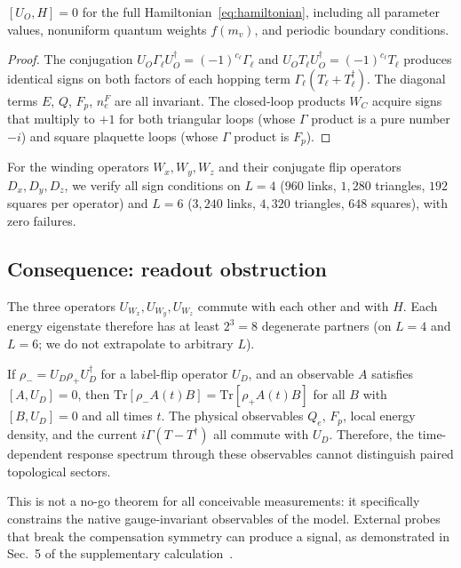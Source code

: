 \documentclass[aps,prb,twocolumn,superscriptaddress,showpacs]{revtex4-2}
\begin{document}
\begin{theorem}
$[U_O,H]=0$ for the full Hamiltonian~\eqref{eq:hamiltonian}, including
all parameter values, nonuniform quantum weights $f(m_v)$, and periodic
boundary conditions.
\end{theorem}

\begin{proof}
The conjugation $U_O\Gamma_\ell U_O^\dagger = (-1)^{c_\ell}\Gamma_\ell$
and $U_OT_\ell U_O^\dagger = (-1)^{c_\ell}T_\ell$ produces identical signs
on both factors of each hopping term $\Gamma_\ell(T_\ell+T_\ell^\dagger)$.
The diagonal terms $E$, $Q$, $F_p$, $n_e^F$ are all invariant. The
closed-loop products $W_C$ acquire signs that multiply to $+1$ for both
triangular loops (whose $\Gamma$ product is a pure number $-i$) and
square plaquette loops (whose $\Gamma$ product is $F_p$).
\end{proof}

For the winding operators $W_x,W_y,W_z$ and their conjugate flip
operators $D_x,D_y,D_z$, we verify all sign conditions on $L=4$
($960$ links, $1{,}280$ triangles, $192$ squares per operator) and
$L=6$ ($3{,}240$ links, $4{,}320$ triangles, $648$ squares), with
zero failures.

\subsection{Consequence: readout obstruction}

The three operators $U_{W_x},U_{W_y},U_{W_z}$ commute with each other
and with $H$. Each energy eigenstate therefore has at least $2^3=8$
degenerate partners (on $L=4$ and $L=6$; we do not extrapolate to
arbitrary $L$).

If $\rho_-=U_D\rho_+U_D^\dagger$ for a label-flip operator $U_D$,
and an observable $A$ satisfies $[A,U_D]=0$, then
$\mathrm{Tr}[\rho_-A(t)B]=\mathrm{Tr}[\rho_+A(t)B]$ for all $B$
with $[B,U_D]=0$ and all times $t$. The physical observables $Q_e$,
$F_p$, local energy density, and the current
$i\Gamma(T-T^\dagger)$ all commute with $U_D$. Therefore, the
time-dependent response spectrum through these observables cannot
distinguish paired topological sectors.

This is not a no-go theorem for all conceivable measurements: it
specifically constrains the native gauge-invariant observables of the
model. External probes that break the compensation symmetry can produce
a signal, as demonstrated in Sec.~5 of the supplementary
calculation~\cite{supplement}.
\end{document}
